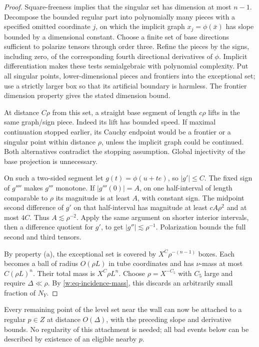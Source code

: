 \begin{proof}
Square-freeness implies that the singular set has dimension at most
$n-1$.  Decompose the bounded regular part into polynomially many
pieces with a specified omitted coordinate $j$, on which the implicit
graph $x_j=\phi(\bar x)$ has slope bounded by a dimensional constant.
Choose a finite set of base directions sufficient to polarize tensors
through order three.  Refine the pieces by the signs, including zero,
of the corresponding fourth directional derivatives of $\phi$.
Implicit differentiation makes these tests semialgebraic with
polynomial complexity.  Put all singular points, lower-dimensional
pieces and frontiers into the exceptional set; use a strictly larger
box so that its artificial boundary is harmless.  The frontier
dimension property gives the stated dimension bound.

At distance $C\rho$ from this set, a straight base segment of length
$c\rho$ lifts in the same graph/sign piece.  Indeed its lift has
bounded speed.  If maximal continuation stopped earlier, its Cauchy
endpoint would be a frontier or a singular point within distance
$\rho$, unless the implicit graph could be continued.  Both alternatives
contradict the stopping assumption.  Global injectivity of the base
projection is unnecessary.

On such a two-sided segment let $g(t)=\phi(u+te)$, so $|g'|\leq C$.
The fixed sign of $g''''$ makes $g'''$ monotone.  If
$|g'''(0)|=A$, on one half-interval of length comparable to $\rho$ its
magnitude is at least $A$, with constant sign.  The midpoint second
difference of $g'$ on that half-interval has magnitude at least
$cA\rho^2$ and at most $4C$.  Thus $A\lesssim\rho^{-2}$.
Apply the same argument on shorter interior intervals, then a
difference quotient for $g'$, to get $|g''|\lesssim\rho^{-1}$.
Polarization bounds the full second and third tensors.

By property \textup{(a)}, the exceptional set is covered by
$X^C\rho^{-(n-1)}$ boxes.  Each becomes a ball of radius $O(\rho L)$
in tube coordinates and has $\nu$-mass at most $C(\rho L)^n$.
Their total mass is $X^C\rho L^n$.  Choose
$\rho=X^{-C_5}$ with $C_5$ large and require $\Delta\ll\rho$.
By \eqref{w:eq-incidence-mass}, this discards an arbitrarily small
fraction of $N_Y$.
\end{proof}

Every remaining point of the level set near the wall can now be
attached to a regular $p\in Z$ at distance $O(\Delta)$, with the
preceding slope and derivative bounds.  No regularity of this
attachment is needed; all bad events below can be described by
existence of an eligible nearby $p$.

